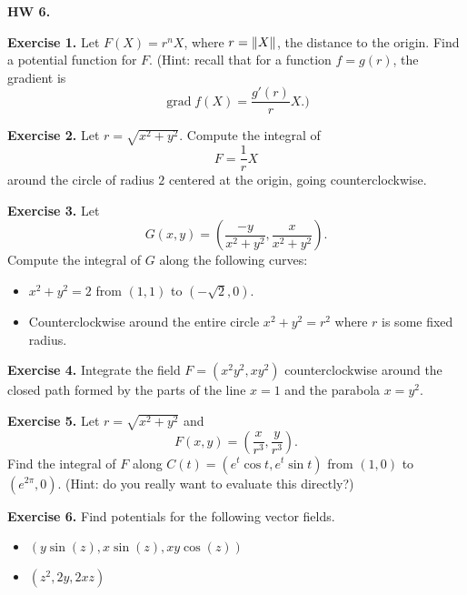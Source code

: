 \documentclass{article}
\DeclareMathOperator{\grd}{grad}
\begin{document}

\textbf{HW 6.}

\textbf{Exercise 1.} 
Let $F(X) = r^n X$, where $r=\norm{X}$, the distance to the origin. 
Find a potential function for $F$. (Hint: recall that for a function 
$f = g(r)$, the gradient is 
\[\grd f(X) = \frac{g'(r)}{r}X.)\]

\textbf{Exercise 2.} 
Let $r = \sqrt{x^2+y^2}$. Compute the integral of \[F = \frac{1}{r}X\] around the circle
of radius $2$ centered at the origin, going counterclockwise.

\textbf{Exercise 3.} 
Let \[G(x,y) = \left( \frac{-y}{x^2+y^2}, \frac{x}{x^2+y^2}\right).\]
Compute the integral of $G$ along the following curves:
\begin{itemize}
    \item $x^2+y^2 = 2$ from $(1,1)$ to $(-\sqrt{2},0)$.
    \item Counterclockwise around the entire circle $x^2+y^2 = r^2$ where $r$ is some fixed radius.
\end{itemize}

\textbf{Exercise 4.} Integrate the field $F = (x^2y^2, xy^2)$ counterclockwise around
the closed path formed by the parts of the line $x=1$ and the 
parabola $x=y^2$.

\textbf{Exercise 5.} Let $r = \sqrt{x^2+y^2}$ and 
\[F(x,y) = \left( \frac{x}{r^3}, \frac{y}{r^3} \right).\]
Find the integral of $F$ along $C(t) = (e^t \cos t, e^t \sin t)$
from $(1,0)$ to $(e^{2\pi},0)$. (Hint: do you really want to 
evaluate this directly?)

\textbf{Exercise 6.} Find potentials for the following vector fields.
\begin{itemize}
    \item $(y\sin(z), x\sin(z), xy\cos(z))$
    \item $(z^2, 2y, 2xz)$
\end{itemize}
\end{document}
